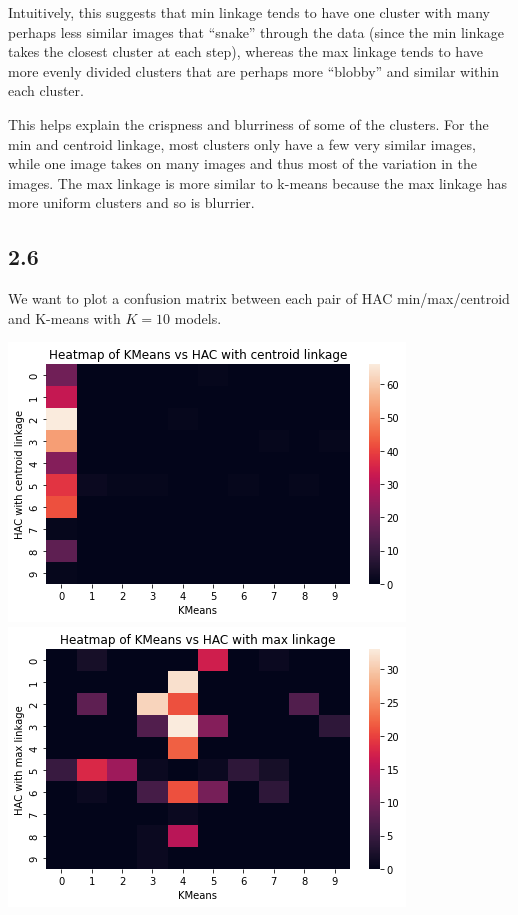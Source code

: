 \documentclass[submit]{harvardml}
\begin{document}
Intuitively, this suggests that min linkage tends to have one cluster with many perhaps less similar images that ``snake'' through the data (since the min linkage takes the closest cluster at each step), whereas the max linkage tends to have more evenly divided clusters that are perhaps more ``blobby'' and similar within each cluster.

This helps explain the crispness and blurriness of some of the clusters. For the min and centroid linkage, most clusters only have a few very similar images, while one image takes on many images and thus most of the variation in the images. The max linkage is more similar to k-means because the max linkage has more uniform clusters and so is blurrier.

\newpage
\subsection*{2.6}
We want to plot a confusion matrix between each pair of HAC min/max/centroid and K-means with $K = 10$ models.

\includegraphics[scale=0.5]{plots/kmeans-haccentroid.png} \
\includegraphics[scale=0.5]{plots/kmeans-hacmax.png}
\end{document}

